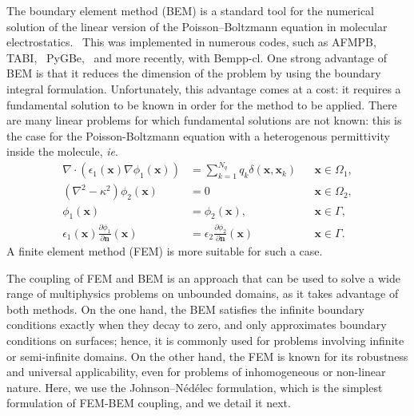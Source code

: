 
The boundary element method (BEM) is a standard tool for the numerical solution of the linear version of the Poisson--Boltzmann equation in molecular electrostatics.~\cite{ZauharMorgan1985, Shaw1985} This was implemented in numerous codes, such as AFMPB,~\cite{LuETal2006} TABI,~\cite{GengKrasny2013} PyGBe,~\cite{CooperBardhanBarba2014,cooper2016pygbe} and more recently, with Bempp-cl\cite{search2022towards}. One strong advantage of BEM is that it reduces the dimension of the problem by using the boundary integral formulation. Unfortunately, this advantage comes at a cost: it requires a fundamental solution to be known in order for the method to be applied. There are many linear problems for which fundamental solutions are not known: this is the case for the Poisson-Boltzmann equation with a heterogenous permittivity inside the molecule, \emph{ie}.
%
\begin{align} \label{eq:pbe_vp}
\nabla \cdot \left(\epsilon_1(\mathbf{x}) \nabla \phi_1(\mathbf{x})\right) &= \sum_{k=1}^{N_q} q_k\delta(\mathbf{x},\mathbf{x}_k) &&\mathbf{x} \in \Omega_1,\nonumber\\
\left(\nabla^2 - \kappa^2\right)\phi_2(\mathbf{x})  &= 0 &&\mathbf{x}\in\Omega_2,\nonumber\\
\phi_1(\mathbf{x})  &= \phi_2(\mathbf{x}),&&\mathbf{x}\in \Gamma,\nonumber\\
\epsilon_1(\mathbf{x})\frac{\partial\phi_1}{\partial\mathbf{n}}(\mathbf{x})  &= \epsilon_2\frac{\partial\phi_2}{\partial\mathbf{n}}(\mathbf{x}) &&\mathbf{x}\in \Gamma. 
\end{align}
%
A finite element method (FEM) is more suitable for such a case.

The coupling of FEM and BEM is an approach that can be used to solve a wide range of multiphysics problems on unbounded domains\cite{hiptmair2002,banjai2015}, as it takes advantage of both methods. On the one hand, the BEM satisfies the infinite boundary conditions exactly when they decay to zero, and only approximates boundary conditions on surfaces; hence, it is commonly used for problems involving infinite or semi-infinite domains. On the other hand, the FEM is known for its robustness and universal applicability, even for problems of inhomogeneous or non-linear nature.
Here, we use the Johnson--N\'ed\'elec formulation,\cite{johnson1980coupling} which is the simplest formulation of FEM-BEM coupling, and we detail it next.

